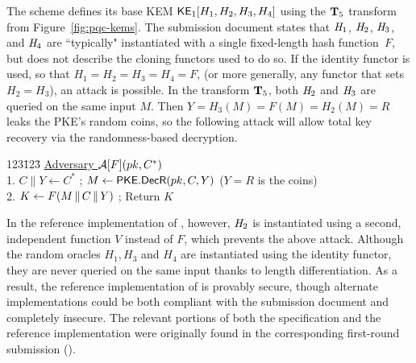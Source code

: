 The scheme 
\cite{nistpqc:ROLLO} defines its base KEM  ${\mathsf{KE}}_1[H_1,H_2,H_3,H_4]$ using the $\mathbf{T}_5$ transform from Figure~\ref{fig:pqc-kems}. The submission document states that $\mathit{H}_1$, $\mathit{H}_2$, $\mathit{H}_3$, and $\mathit{H}_4$ are ``typically" instantiated with a single fixed-length hash function~$F$, but does not 
describe the cloning functors used to do so. 
If the identity functor is used, so that $H_1 = H_2 = H_3 = H_4 = F$, (or more generally, any functor that sets $H_2=H_3$), an attack is possible.
In the transform $\mathbf{T}_5$, both $\mathit{H}_2$ and $\mathit{H}_3$ are queried on the same input $M$. Then $Y = H_3(M) = F(M) = H_2(M) = R$ leaks the PKE's random coins, so the following attack will allow total key recovery via the randomness-based decryption. 
\begin{tabbing}
	123\=123\=\kill
	\underline{Adversary $\mathcal{A}[F](pk,C^*)$}  \\[2pt]
	1. \> $C\|Y\gets C^*$ ; $M\gets \mathsf{{\mathsf{PKE}}.DecR}(pk,C,Y)$ \Comment ($Y=R$ is the coins) \\
	2. \> $K \gets F(M{\,\|\,} C {\,\|\,} Y)$ ; Return $K$
\end{tabbing}
In the reference implementation of , however, $\mathit{H}_2$ is instantiated using a second, independent function $V$ instead of $F$, which prevents the above attack. 
Although the random oracles $H_1,H_3$ and $H_4$ are instantiated using the identity functor, they are never queried on the same input thanks to length differentiation.
As a result, the reference implementation of  is provably secure, though alternate implementations could be both compliant with the submission document and completely insecure. 
The relevant portions of both the specification and the reference implementation were originally found in the corresponding first-round submission ().%

